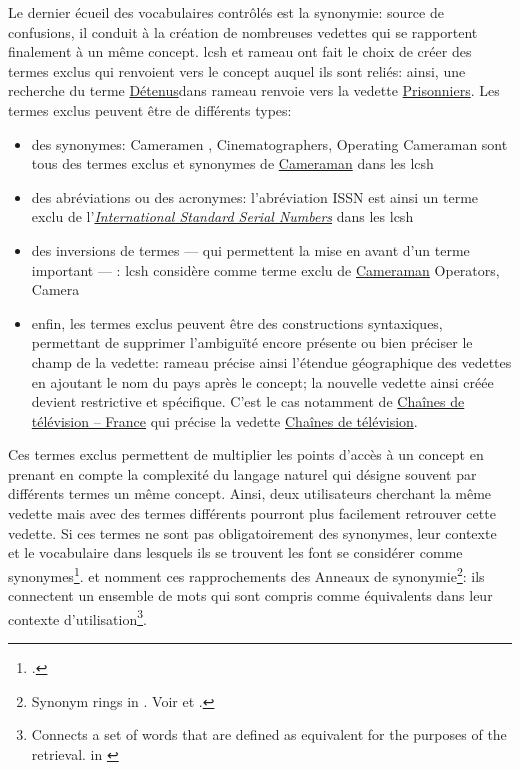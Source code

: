 Le dernier écueil des vocabulaires contrôlés est la synonymie: source de confusions, il conduit à la création de nombreuses vedettes qui se rapportent finalement à un même concept. \ac{lcsh} et \ac{rameau} ont fait le choix de créer des termes exclus qui renvoient vers le concept auquel ils sont reliés: ainsi, une recherche du terme \og \href{https://data.bnf.fr/fr/search?term=detenus#Rameau}{Détenus}\fg dans \ac{rameau} renvoie vers la vedette \og\href{https://data.bnf.fr/fr/13318775/prisonniers/}{Prisonniers}\fg{}. Les termes exclus peuvent être de différents types:
\begin{itemize}
	\item des synonymes: \og Cameramen \fg{}, \og Cinematographers\fg{}, \og Operating Cameraman\fg{} sont tous des termes exclus et synonymes de \og\href{https://id.loc.gov/authorities/subjects/sh2002011142.html}{Cameraman}\fg{} dans les \ac{lcsh}
	\item des abréviations ou des acronymes: l'abréviation \og ISSN\fg{} est ainsi un terme exclu de l'\og\href{https://id.loc.gov/authorities/subjects/sh85067450.html}{\textit{International Standard Serial Numbers}}\fg{} dans les \ac{lcsh}
	\item des inversions de termes --- qui permettent la mise en avant d'un terme important --- : \ac{lcsh} considère comme terme exclu de \og\href{https://id.loc.gov/authorities/subjects/sh2002011142.html}{Cameraman}\fg{} \og Operators, Camera\fg{}
	\item enfin, les termes exclus peuvent être des constructions syntaxiques, permettant de supprimer l'ambiguïté encore présente ou bien préciser le champ de la vedette: \ac{rameau} précise ainsi l'étendue géographique des vedettes en ajoutant le nom du pays après le concept; la nouvelle vedette ainsi créée devient restrictive et spécifique. C'est le cas notamment de \og\href{https://data.bnf.fr/fr/11979998/chaines_de_television_--_france/}{Chaînes de télévision -- France}\fg{} qui précise la vedette \og\href{https://data.bnf.fr/fr/11936935/chaines_de_television/}{Chaînes de télévision}\fg{}.
\end{itemize}
\bigskip

 Ces termes exclus permettent de multiplier les points d'accès à un concept en prenant en compte la complexité du langage naturel qui désigne souvent par différents termes un même concept. Ainsi, deux utilisateurs cherchant la même vedette mais avec des termes différents pourront plus facilement retrouver cette vedette. Si ces termes ne sont pas obligatoirement des synonymes, leur contexte et le vocabulaire dans lesquels ils se trouvent les font se considérer comme synonymes\footcite{rosenfeld_information_2015}.  et  nomment ces rapprochements des \og Anneaux de synonymie\fg{}\footnote{\og Synonym rings\fg{} in \cite{rosenfeld_information_2015}. Voir  et .}: ils connectent un ensemble de mots qui sont compris comme équivalents dans leur contexte d'utilisation\footnote{\og Connects a set of words that are defined as equivalent for the purposes of the retrieval.\fg{} in \cite{rosenfeld_information_2015}}.

 
 